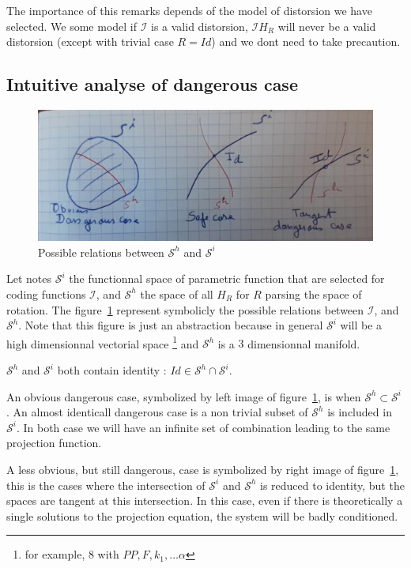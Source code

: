 The importance of this remarks depends of the model of distorsion we have selected.
We some model if $\mathcal{I}$ is a valid distorsion,  $\mathcal{I} H_{R}$ will
never be a valid distorsion (except with trivial case $R=Id$) and we dont need
to take precaution.


\subsection{Intuitive analyse of dangerous case}

\begin{figure}
\centering
\includegraphics[width=12cm]{Methods/Images/TangentSpace.jpg}\caption{Possible relations between $\mathcal{S}^h$ and $\mathcal{S}^i$}
	\label{fig:TanSpace}
\end{figure}


Let notes  $\mathcal{S}^i$ the functionnal space of parametric function  that are selected
for coding functions $\mathcal{I}$, and $\mathcal{S}^h$ the space of all $H_R$ for
$R$ parsing the space of rotation.
The figure~\ref{fig:TanSpace} represent symbolicly the possible relations between
$\mathcal{I}$, and $\mathcal{S}^h$.  Note that this figure is just an
abstraction because in general $\mathcal{S}^i$ will be a high dimensionnal
vectorial space \footnote{for example, $8$ with $PP,F,k_1,\dots\alpha$} 
and  $\mathcal{S}^h$  is a $3$ dimensionnal manifold.

$\mathcal{S}^h$ and $ \mathcal{S}^i$  both contain identity  : $Id \in \mathcal{S}^h \cap \mathcal{S}^i$. 

An obvious dangerous case, symbolized by left image of
figure~\ref{fig:TanSpace},  is when $\mathcal{S}^h \subset \mathcal{S}^i$ .
An almost identicall dangerous case is a non trivial subset of $\mathcal{S}^h$
is included in  $\mathcal{S}^i$. In both case we will have an infinite set of combination
leading to the same projection function.


A less obvious, but still dangerous, case is symbolized by right image of figure~\ref{fig:TanSpace},
this is the cases where the intersection of $\mathcal{S}^i$ and $\mathcal{S}^h$   is reduced to 
identity, but the spaces are tangent at this intersection. In this case, even if there is theoretically
a single solutions to  the projection equation, the system will be badly conditioned.

